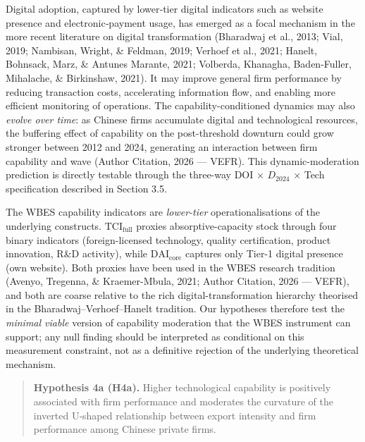 \documentclass[12pt,a4paper]{article}
\begin{document}
Digital adoption, captured by lower‑tier digital indicators such as
website presence and electronic‑payment usage, has emerged as a focal
mechanism in the more recent literature on digital transformation
(Bharadwaj et al., 2013; Vial, 2019; Nambisan, Wright, \& Feldman, 2019;
Verhoef et al., 2021; Hanelt, Bohnsack, Marz, \& Antunes Marante, 2021;
Volberda, Khanagha, Baden-Fuller, Mihalache, \& Birkinshaw, 2021). It
may improve general firm performance by reducing transaction costs,
accelerating information flow, and enabling more efficient monitoring of
operations. The capability-conditioned dynamics may also \emph{evolve
over time}: as Chinese firms accumulate digital and technological
resources, the buffering effect of capability on the post-threshold
downturn could grow stronger between 2012 and 2024, generating an
interaction between firm capability and wave (Author Citation, 2026 ---
VEFR). This dynamic-moderation prediction is directly testable through
the three-way DOI × \(D_{2024}\) × Tech specification described in
Section 3.5.

The WBES capability indicators are \emph{lower-tier} operationalisations
of the underlying constructs. \(\mathrm{TCI}_{\text{full}}\) proxies
absorptive-capacity stock through four binary indicators
(foreign-licensed technology, quality certification, product innovation,
R\&D activity), while \(\mathrm{DAI}_{\text{core}}\) captures only
Tier-1 digital presence (own website). Both proxies have been used in
the WBES research tradition (Avenyo, Tregenna, \& Kraemer-Mbula, 2021;
Author Citation, 2026 --- VEFR), and both are coarse relative to the
rich digital-transformation hierarchy theorised in the
Bharadwaj--Verhoef--Hanelt tradition. Our hypotheses therefore test the
\emph{minimal viable} version of capability moderation that the WBES
instrument can support; any null finding should be interpreted as
conditional on this measurement constraint, not as a definitive
rejection of the underlying theoretical mechanism.

\begin{quote}
\textbf{Hypothesis 4a (H4a).} Higher technological capability is
positively associated with firm performance and moderates the curvature
of the inverted U‑shaped relationship between export intensity and firm
performance among Chinese private firms.
\end{quote}
\end{document}
